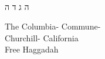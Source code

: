 \documentclass[a4paper,10pt,openany]{memoir}
\newenvironment{HgHebrew}{\begin{hebrew}\strut\\\noindent\LARGE}{\end{hebrew}}
\begin{document}
\pagestyle{empty}
\strut
\vfill

\begin{center}

\begin{HgHebrew}
\fontsize{120pt}{120pt}
\selectfont
\hspace{-10pt}
ה
\hfill 
ג 
\hfill
ד 
\hfill
ה
\end{HgHebrew}
\vspace{5em}

\fontsize{28pt}{28pt}
\selectfont
The 
Columbia-%
Commune-%
\\[.2em]
\fontsize{37pt}{37pt}
\selectfont
Churchill-%
California
\\
\fontsize{50pt}{50pt}
\selectfont
Free 
Haggadah
\end{center}
\vspace{10em}
\vfill
\end{document}
